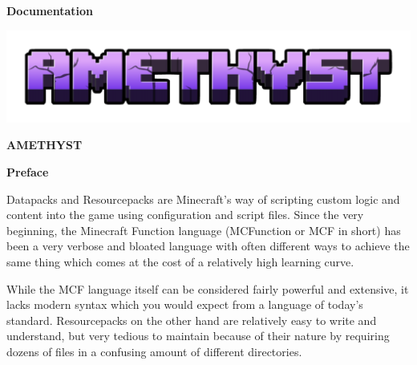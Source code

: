 \documentclass[12pt]{article}
\author{Fabian Hummel}
\begin{document}
    \begin{titlepage}
        \begin{center}
        
        \fontsize{40}{0}\selectfont\textbf{Documentation}
        
        \vspace{3cm}
        
        \includegraphics[scale=0.5]{./logo.png}
        
        \fontsize{20}{30}\selectfont\uppercase{\textbf{Amethyst}}
        
        \vspace{2cm}
        
        \fontsize{20}{30}\selectfont{Compiled language framework for Minecraft Datapacks and Resourcepacks}
        
        \vfill
        
        \fontsize{15}{0}\selectfont{Fabian Hummel}
        \end{center}
    \end{titlepage}

\onehalfspacing

\clearpage
\setlength{\parskip}{\baselineskip}%
\vspace*{-2.9cm}
{\textbf{\LARGE Preface}}
\vspace*{0.9cm}

Datapacks and Resourcepacks are Minecraft's way of scripting custom logic and content into the game using configuration and script files. Since the very beginning, the Minecraft Function language (MCFunction or MCF in short) has been a very verbose and bloated language with often different ways to achieve the same thing which comes at the cost of a relatively high learning curve.

While the MCF language itself can be considered fairly powerful and extensive, it lacks modern syntax which you would expect from a language of today's standard. Resourcepacks on the other hand are relatively easy to write and understand, but very tedious to maintain because of their nature by requiring dozens of files in a confusing amount of different directories.
\end{document}
